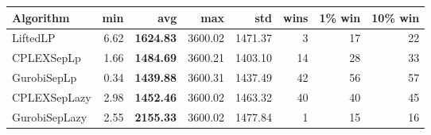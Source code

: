 \begin{tabular}{lrrrrrrr}
Algorithm & min & avg & max & std
& wins & 1\% win & 10\% win 
\\
\hline
LiftedLP&6.62& \bf1624.83& 3600.02& 1471.37&3&17&22\\
CPLEXSepLp&1.66& \bf1484.69& 3600.21& 1403.10&14&28&33\\
GurobiSepLp&0.34& \bf1439.88& 3600.31& 1437.49&42&56&57\\
CPLEXSepLazy&2.98& \bf1452.46& 3600.02& 1463.32&40&40&45\\
GurobiSepLazy&2.55& \bf2155.33& 3600.02& 1477.84&1&15&16
\end{tabular}
